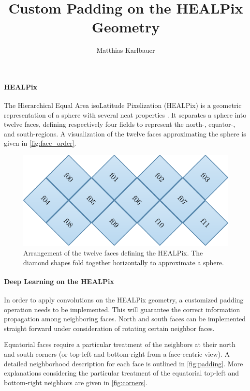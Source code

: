 \documentclass{scrartcl}
\title{Custom Padding on the HEALPix Geometry}
\author{Matthias Karlbauer}
\begin{document}
	\maketitle
	
	\paragraph{HEALPix} The Hierarchical Equal Area isoLatitude Pixelization (HEALPix) is a geometric representation of a sphere with several neat properties \cite{gorski2005healpix}. It separates a sphere into twelve faces, defining respectively four fields to represent the north-, equator-, and south-regions. A visualization of the twelve faces approximating the sphere is given in \autoref{fig:face_order}.
	
	\begin{figure}
		\includegraphics[width=\linewidth]{pics/face_order}
		\caption{Arrangement of the twelve faces defining the HEALPix. The diamond shapes fold together horizontally to approximate a sphere.}
		\label{fig:face_order}
	\end{figure}
	
	\paragraph{Deep Learning on the HEALPix} In order to apply convolutions on the HEALPix geometry, a customized padding operation needs to be implemented. This will guarantee the correct information propagation among neighboring faces. North and south faces can be implemented straight forward under consideration of rotating certain neighbor faces.
	
	Equatorial faces require a particular treatment of the neighbors at their north and south corners (or top-left and bottom-right from a face-centric view). A detailed neighborhood description for each face is outlined in \autoref{fig:padding}. More explanations considering the particular treatment of the equatorial top-left and bottom-right neighbors are given in \autoref{fig:corners}.
	
\end{document}
